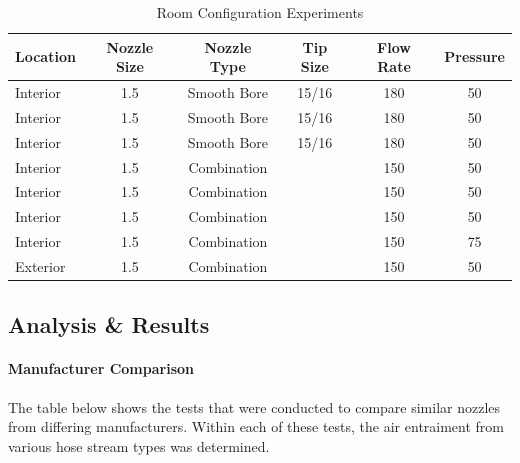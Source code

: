 \documentclass{article}
\begin{document}
\begin{table}[!ht]
\centering
\begin{tabular}{|lccccc|}
\hline
\multicolumn{1}{|c|}{\textbf{Location}} & \multicolumn{1}{c|}{\textbf{Nozzle Size}} & \multicolumn{1}{c|}{\textbf{Nozzle Type}} & \multicolumn{1}{c|}{\textbf{Tip Size}} & \multicolumn{1}{c|}{\textbf{Flow Rate}} & \textbf{Pressure} \\ \hline
Interior & 1.5 & Smooth Bore & 15/16 & 180 & 50 \\
Interior & 1.5 & Smooth Bore & 15/16 & 180 & 50 \\
Interior & 1.5 & Smooth Bore & 15/16 & 180 & 50 \\
Interior & 1.5 & Combination &  & 150 & 50 \\
Interior & 1.5 & Combination &  & 150 & 50 \\
Interior & 1.5 & Combination &  & 150 & 50 \\
Interior & 1.5 & Combination &  & 150 & 75 \\
Exterior & 1.5 & Combination &  & 150 & 50 \\ \hline
\end{tabular}
\caption{Room Configuration Experiments}
\label{Room_Configuration_Experiments}
\end{table}

\clearpage

\subsection{Analysis \& Results}

\vspace*{\baselineskip}



\vspace*{\baselineskip}

\paragraph{Manufacturer Comparison}

The table below shows the tests that were conducted to compare similar nozzles from differing manufacturers. Within each of these tests, the air entraiment from various hose stream types was determined.
\end{document}
